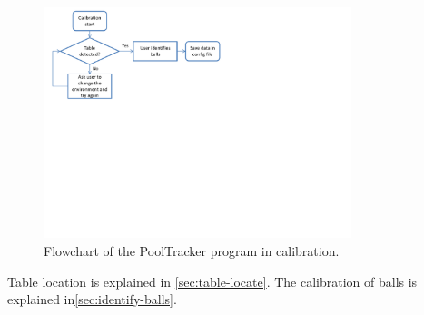 \begin{figure}[H]
\begin{center}
\leavevmode
\includegraphics[width=0.8\textwidth]{images/calib_flowchart}
\end{center}
\caption{Flowchart of the PoolTracker program in calibration.}
\label{fig:program_flowchart}
\end{figure}

Table location is explained in \ref{sec:table-locate}. The calibration of balls is explained in\ref{sec:identify-balls}.


